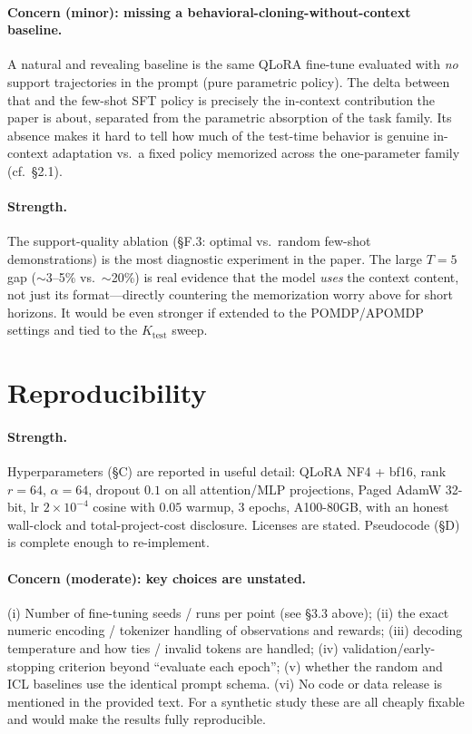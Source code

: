 \documentclass[11pt]{article}
\newcommand{\Ktest}{K_{\mathrm{test}}}
\begin{document}
\paragraph{Concern (minor): missing a behavioral-cloning-without-context baseline.} A natural
and revealing baseline is the same QLoRA fine-tune evaluated with \emph{no} support
trajectories in the prompt (pure parametric policy). The delta between that and the few-shot
SFT policy is precisely the in-context contribution the paper is about, separated from the
parametric absorption of the task family. Its absence makes it hard to tell how much of the
test-time behavior is genuine in-context adaptation vs.\ a fixed policy memorized across the
one-parameter family (cf.\ \S2.1).

\paragraph{Strength.} The support-quality ablation (\S F.3: optimal vs.\ random few-shot
demonstrations) is the most diagnostic experiment in the paper. The large $T=5$ gap
($\sim$3--5\% vs.\ $\sim$20\%) is real evidence that the model \emph{uses} the context content,
not just its format---directly countering the memorization worry above for short horizons. It
would be even stronger if extended to the POMDP/APOMDP settings and tied to the $\Ktest$ sweep.

\section{Reproducibility}

\paragraph{Strength.} Hyperparameters (\S C) are reported in useful detail: QLoRA NF4 +
bf16, rank $r=64$, $\alpha=64$, dropout $0.1$ on all attention/MLP projections, Paged AdamW
32-bit, lr $2\times10^{-4}$ cosine with $0.05$ warmup, 3 epochs, A100-80GB, with an honest
wall-clock and total-project-cost disclosure. Licenses are stated. Pseudocode (\S D) is
complete enough to re-implement.

\paragraph{Concern (moderate): key choices are unstated.} (i) Number of fine-tuning seeds /
runs per point (see \S3.3 above); (ii) the exact numeric encoding / tokenizer handling of
observations and rewards; (iii) decoding temperature and how ties / invalid tokens are handled;
(iv) validation/early-stopping criterion beyond ``evaluate each epoch''; (v) whether the random
and ICL baselines use the identical prompt schema. (vi) No code or data release is mentioned in
the provided text. For a synthetic study these are all cheaply fixable and would make the
results fully reproducible.
\end{document}
